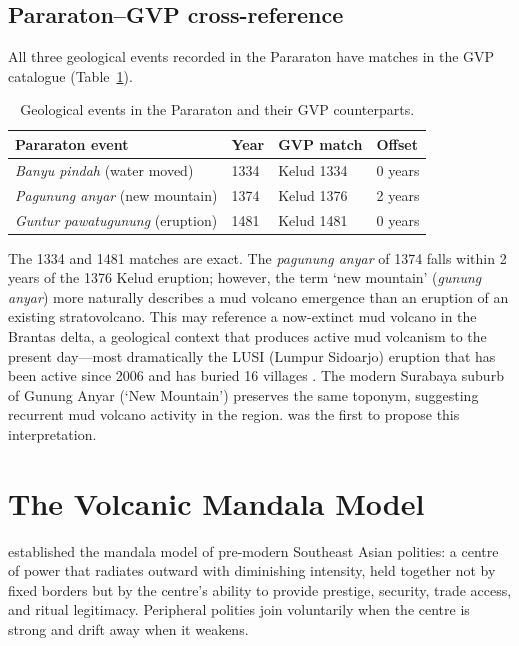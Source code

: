 \documentclass[12pt,a4paper]{article}
\begin{document}
\subsection{Pararaton--GVP cross-reference}

All three geological events recorded in the Pararaton have matches in the GVP catalogue (Table~\ref{tab:crossref}).

\begin{table}[htbp]
\centering
\caption{Geological events in the Pararaton and their GVP counterparts.}
\label{tab:crossref}
\begin{tabular}{llll}
\toprule
Pararaton event & Year & GVP match & Offset \\
\midrule
\textit{Banyu pindah} (water moved) & 1334 & Kelud 1334 & 0 years \\
\textit{Pagunung anyar} (new mountain) & 1374 & Kelud 1376 & 2 years \\
\textit{Guntur pawatugunung} (eruption) & 1481 & Kelud 1481 & 0 years \\
\bottomrule
\end{tabular}
\end{table}

\noindent
The 1334 and 1481 matches are exact.
The \textit{pagunung anyar} of 1374 falls within 2 years of the 1376 Kelud eruption; however, the term `new mountain' (\textit{gunung anyar}) more naturally describes a mud volcano emergence than an eruption of an existing stratovolcano.
This may reference a now-extinct mud volcano in the Brantas delta, a geological context that produces active mud volcanism to the present day---most dramatically the LUSI (Lumpur Sidoarjo) eruption that has been active since 2006 and has buried 16 villages \citep{davies2011}.
The modern Surabaya suburb of Gunung Anyar (`New Mountain') preserves the same toponym, suggesting recurrent mud volcano activity in the region.
\citet{satyana2015} was the first to propose this interpretation.

\section{The Volcanic Mandala Model}

\citet{wolters1982} established the mandala model of pre-modern Southeast Asian polities: a centre of power that radiates outward with diminishing intensity, held together not by fixed borders but by the centre's ability to provide prestige, security, trade access, and ritual legitimacy.
Peripheral polities join voluntarily when the centre is strong and drift away when it weakens.
\end{document}
